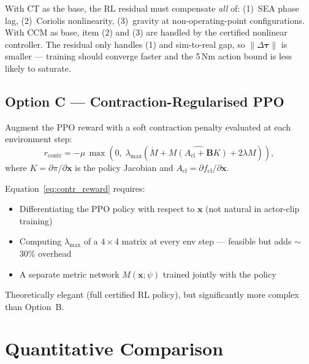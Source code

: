 \documentclass[11pt,a4paper]{article}
\newcommand{\btau}{\bm{\tau}}
\newcommand{\bx}{\bm{x}}
\newcommand{\bB}{\bm{B}}
\begin{document}
\begin{contractionbox}
With CT as the base, the RL residual must compensate \emph{all} of:
(1)~SEA phase lag, (2)~Coriolis nonlinearity, (3)~gravity at non-operating-point
configurations. With CCM as base, item (2) and (3) are handled by the certified
nonlinear controller. The residual only handles (1) and sim-to-real gap,
so $\|\Delta\btau\|$ is smaller --- training should converge faster and the
5\,Nm action bound is less likely to saturate.
\end{contractionbox}

\subsection{Option C --- Contraction-Regularised PPO}
\label{sec:optC}

Augment the PPO reward with a soft contraction penalty evaluated at each environment step:
\begin{equation}
  r_{\mathrm{contr}} = -\mu\,\max\!\left(0,\;
  \lambda_{\max}\!\left(
    \dot M + \widehat{M(A_{\mathrm{cl}} + \bB K)} + 2\lambda M
  \right)\right),
  \label{eq:contr_reward}
\end{equation}
where $K = \partial\pi/\partial\bx$ is the policy Jacobian and $A_{\mathrm{cl}} = \partial f_{\mathrm{cl}}/\partial\bx$.

\begin{warnbox}
Equation~\eqref{eq:contr_reward} requires:
\begin{itemize}[topsep=2pt,itemsep=1pt]
  \item Differentiating the PPO policy with respect to $\bx$ (not natural in actor-clip training)
  \item Computing $\lambda_{\max}$ of a $4{\times}4$ matrix at every env step --- feasible but adds $\sim$30\% overhead
  \item A separate metric network $M(\bx;\psi)$ trained jointly with the policy
\end{itemize}
Theoretically elegant (full certified RL policy), but significantly more complex than Option~B.
\end{warnbox}

\section{Quantitative Comparison}
\label{sec:comparison}
\end{document}
